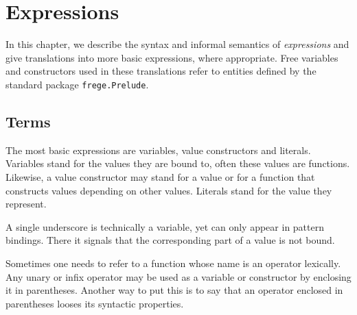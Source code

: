 

\chapter{Expressions} \label{expressions} 

In this chapter, we describe the syntax and informal semantics of \frege{} \emph{expressions} and give translations into more basic expressions, where appropriate.
Free variables and constructors used in these translations refer to entities defined by the standard package \texttt{frege.Prelude}.

\section{Terms} 

\begin{flushleft}
  
  \alt{}   
  \alt{} 
  \alt{} \regex{\_} 
  \alt{} \sym{(}  \sym{)}
  \alt{} \sym{(}  \sym{)}
  \alt{} \sym{(}   \sym{)}
  \alt{} 
  \alt{} \sym{(} \sym{)} 
  \alt{}  
  \alt{}   
  \alt{}  
\end{flushleft}

The most basic expressions are variables, value constructors and literals.
Variables stand for the values they are bound to, often these values are functions.
Likewise, a value constructor may stand for a value or for a function that constructs values depending on other values.
Literals stand for the value they represent.

A single underscore is technically a variable, yet can only appear in pattern bindings. There it signals that the corresponding part of a value is not bound.

Sometimes one needs to refer to a function whose name is an operator lexically. Any unary or infix operator may be used as a variable or constructor by enclosing it in parentheses.
Another way to put this is to say that an operator enclosed in parentheses looses its syntactic properties.



